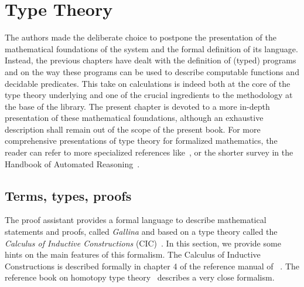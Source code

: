 \chapter{Type Theory}{}
\label{ch:ttch}

The authors made the deliberate choice to postpone the presentation of
the mathematical foundations of the \Coq{} system and the formal
definition of its language. Instead, the previous chapters have
dealt with the definition of (typed) programs and on the way these
programs can be used to describe computable functions and decidable
predicates. This take on calculations is indeed both at the core of
the type theory underlying \Coq{} and one of the crucial ingredients
to the methodology at the base of the \mcbMC{} library. The present chapter is
devoted to a more in-depth presentation of these mathematical
foundations, although an exhaustive description shall remain out of
the scope of the present book. For more comprehensive presentations of
type theory for formalized mathematics, the reader can refer to more
specialized references like~\cite{ttfp}, or the
shorter survey in the Handbook of Automated
Reasoning~\cite[Volume 2, chapter 18]{handbook-ar}.

\section{Terms, types, proofs}\label{sec:chi}

The \Coq{} proof assistant provides a formal language to describe
mathematical statements and proofs, called
\emph{Gallina} and based on a type theory called the
\emph{Calculus of Inductive
  Constructions} (CIC)~\cite{coquand:huet:88,CoPa89}. In this section, we
provide some hints on the main features of this formalism. The
Calculus of Inductive Constructions is described formally in chapter 4
of the reference manual of \Coq{}~\cite{Coq:manual}. The reference book on
homotopy type theory~\cite{hottbook} describes a very close formalism.



